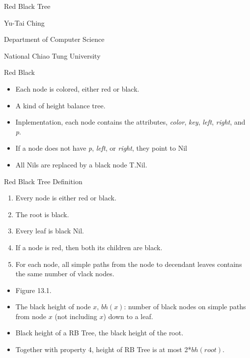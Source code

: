\documentclass{beamer}
\begin{document}
\begin{frame}{}

\vspace{1in}
\centerline{\Large Red Black Tree}
\vspace{0.5cm}
\centerline{Yu-Tai Ching}
\centerline{Department of Computer Science}
\centerline{National Chiao Tung University} 
\end{frame}

\begin{frame}{Red Black}

\begin{itemize}
\item Each node is colored, either red or black. 
\item A kind of height balance tree. 
\item Inplementation, each node contains the attributes, {\it color}, {\it key}, {\it left}, {\it right}, and {\it p}. 
\item If a node does not have {\it p}, {\it left}, or {\it right}, they point to {\sc Nil}
\item All {\sc Nil}s are replaced by a black node {\sc T.Nil}. 
\end{itemize}
\end{frame}

\begin{frame}{Red Black Tree Definition}
\begin{enumerate}
\item Every node is either red or black. 
\item The root is black. 
\item Every leaf is black {\sc Nil}.
\item If a node is red, then both its children are black. 
\item For each node, all simple paths from the node to decendant leaves contains the same number of vlack nodes.  
\end{enumerate}
\begin{itemize}
\item Figure 13.1.
\item The black height of node $x$, $bh(x)$: number of black nodes on simple paths from node $x$ (not including $x$) down to a leaf. 
\item Black height of a RB Tree, the black height of the root. 
\item Together with property 4, height of RB Tree is at most 2*$bh(root)$. 
\end{itemize}
\end{frame}
\end{document}
